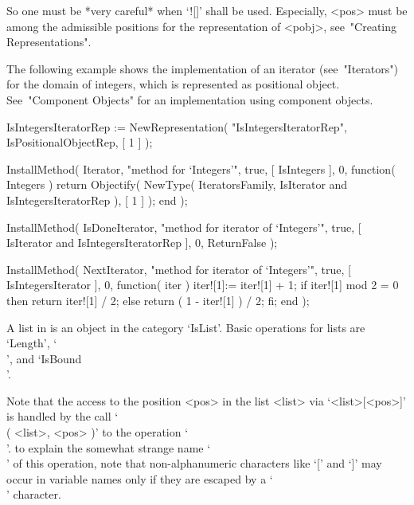 So one must be *very careful* when `![]' shall be used.
Especially, <pos> must be among the admissible positions for
the representation of <pobj>, see~"Creating Representations".

The following example shows the implementation of an iterator
(see~"Iterators") for the domain of integers,
which is represented as positional object.
See~"Component Objects" for an implementation using component objects.

\begintt
    IsIntegersIteratorRep := NewRepresentation( "IsIntegersIteratorRep",
        IsPositionalObjectRep, [ 1 ] );

    InstallMethod( Iterator,
        "method for `Integers'",
        true,
        [ IsIntegers ], 0,
        function( Integers )
        return Objectify( NewType( IteratorsFamily,
                                       IsIterator
                                   and IsIntegersIteratorRep ),
                          [ 1 ] );
        end );

    InstallMethod( IsDoneIterator,
        "method for iterator of `Integers'",
        true,
        [ IsIterator and IsIntegersIteratorRep ], 0,
        ReturnFalse );

    InstallMethod( NextIterator,
        "method for iterator of `Integers'",
        true,
        [ IsIntegersIterator ], 0,
        function( iter )
        iter![1]:= iter![1] + 1;
        if iter![1] mod 2 = 0 then
          return iter![1] / 2;
        else
          return ( 1 - iter![1] ) / 2;
        fi;
        end );
\endtt


A list in {\GAP} is an object in the category `IsList'.
Basic operations for lists are `Length', `\\[\\]', and `IsBound\\[\\]'.

Note that the access to the position <pos> in the list <list>
via `<list>[<pos>]' is handled by the call `\\[\\]( <list>, <pos> )'
to the operation `\\[\\]'.
to explain the somewhat strange name `\\[\\]' of this operation,
note that non-alphanumeric characters like `[' and `]' may occur in
{\GAP} variable names only if they are escaped by a `\\' character.

